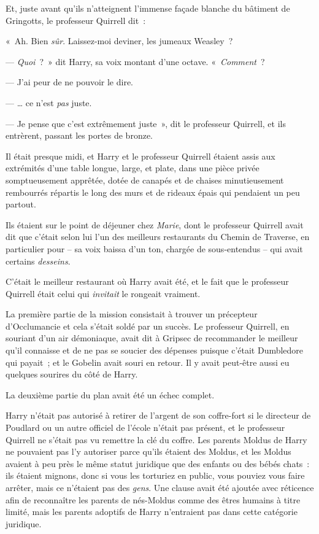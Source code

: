 Et, juste avant qu'ils n'atteignent l'immense façade blanche du bâtiment de Gringotts, le professeur Quirrell dit~:

«~Ah. Bien \emph{sûr}. Laissez-moi deviner, les jumeaux Weasley~?

--- \emph{Quoi}~?~» dit Harry, sa voix montant d'une octave. «~\emph{Comment}~?

--- J'ai peur de ne pouvoir le dire.

--- … ce n'est \emph{pas} juste.

--- Je pense que c'est extrêmement juste~», dit le professeur Quirrell, et ils entrèrent, passant les portes de bronze.

\later

Il était presque midi, et Harry et le professeur Quirrell étaient assis aux extrémités d'une table longue, large, et plate, dans une pièce privée somptueusement apprêtée, dotée de canapés et de chaises minutieusement rembourrés répartis le long des murs et de rideaux épais qui pendaient un peu partout.

Ils étaient sur le point de déjeuner chez \emph{Marie}, dont le professeur Quirrell avait dit que c'était selon lui l'un des meilleurs restaurants du Chemin de Traverse, en particulier pour -- sa voix baissa d'un ton, chargée de sous-entendus -- qui avait certains \emph{desseins}.

C'était le meilleur restaurant où Harry avait été, et le fait que le professeur Quirrell était celui qui \emph{invitait} le rongeait vraiment.

La première partie de la mission consistait à trouver un précepteur d'Occlumancie et cela s'était soldé par un succès. Le professeur Quirrell, en souriant d'un air démoniaque, avait dit à Gripsec de recommander le meilleur qu'il connaisse et de ne pas se soucier des dépenses puisque c'était Dumbledore qui payait~; et le Gobelin avait souri en retour. Il y avait peut-être aussi eu quelques sourires du côté de Harry.

La deuxième partie du plan avait été un échec complet.

Harry n'était pas autorisé à retirer de l'argent de son coffre-fort si le directeur de Poudlard ou un autre officiel de l'école n'était pas présent, et le professeur Quirrell ne s'était pas vu remettre la clé du coffre. Les parents Moldus de Harry ne pouvaient pas l'y autoriser parce qu'ils étaient des Moldus, et les Moldus avaient à peu près le même statut juridique que des enfants ou des bébés chats~: ils étaient mignons, donc si vous les torturiez en public, vous pouviez vous faire arrêter, mais ce n'étaient pas des \emph{gens}. Une clause avait été ajoutée avec réticence afin de reconnaître les parents de nés-Moldus comme des êtres humains à titre limité, mais les parents adoptifs de Harry n'entraient pas dans cette catégorie juridique.

